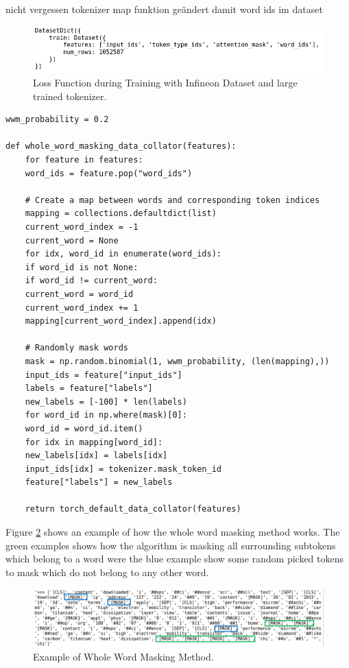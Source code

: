 \alert{nicht vergessen tokenizer map funktion geändert damit word ids im dataset}

\begin{figure}[H]
	\centering
	\includegraphics[width=1\textwidth]{figures/tok_dataset_wordids.png}
	\caption{Loss Function during Training with Infineon Dataset and large trained tokenizer.}
	\label{fig:data_wordids}
\end{figure}

\begin{code}
	\label{code:wwm}
\begin{verbatim}
wwm_probability = 0.2

def whole_word_masking_data_collator(features):
	for feature in features:
	word_ids = feature.pop("word_ids")
	
	# Create a map between words and corresponding token indices
	mapping = collections.defaultdict(list)
	current_word_index = -1
	current_word = None
	for idx, word_id in enumerate(word_ids):
	if word_id is not None:
	if word_id != current_word:
	current_word = word_id
	current_word_index += 1
	mapping[current_word_index].append(idx)
	
	# Randomly mask words
	mask = np.random.binomial(1, wwm_probability, (len(mapping),))
	input_ids = feature["input_ids"]
	labels = feature["labels"]
	new_labels = [-100] * len(labels)
	for word_id in np.where(mask)[0]:
	word_id = word_id.item()
	for idx in mapping[word_id]:
	new_labels[idx] = labels[idx]
	input_ids[idx] = tokenizer.mask_token_id
	feature["labels"] = new_labels
	
	return torch_default_data_collator(features)
\end{verbatim}
\end{code}

\alert{Figure \ref{fig:wwm_ex} shows an example of how the whole word masking method works. The green examples shows how the algorithm is masking all surrounding subtokens which belong to a word were the blue example show some random picked tokens to mask which do not belong to any other word.}

\begin{figure}[H]
 	\centering
 	\includegraphics[width=1\textwidth]{figures/wwm_example.png}
 	\caption{Example of Whole Word Masking Method.}
 	\label{fig:wwm_ex}
 \end{figure}

